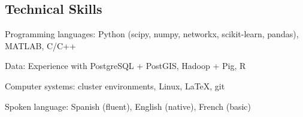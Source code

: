 \documentclass[margin,line]{res}
\newenvironment{list1}{
  \begin{list}{$\cdot$}{%
      \setlength{\itemsep}{0in}
      \setlength{\parsep}{0in} \setlength{\parskip}{0in}
      \setlength{\topsep}{0in} \setlength{\partopsep}{0in} 
      \setlength{\leftmargin}{0.17in}}}{\end{list}}
\begin{document}
\begin{resume}




  \section{\sc Technical Skills} 
  Programming languages: Python (scipy, numpy, networkx, scikit-learn, pandas),
  MATLAB, C/C++

  Data: Experience with PostgreSQL + PostGIS, Hadoop + Pig, R

  Computer systems: cluster environments, Linux, \LaTeX, git

  Spoken language: Spanish (fluent), English (native), French (basic)



\end{resume}
\end{document}
